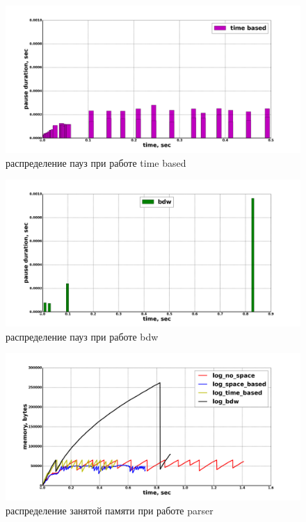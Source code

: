 \documentclass[14pt]{extarticle}
\begin{document}
\begin{figure}[ph]
\caption{\label{pic:time-based-pause}распределение пауз при работе time based}
\includegraphics[width=1\linewidth]{time_based.png}
\end{figure}

\begin{figure}[ph]
\caption{\label{pic:pause-bdw}распределение пауз при работе bdw}
\includegraphics[width=1\linewidth]{bdw.png}
\end{figure}

\begin{figure}[ph]
\caption{\label{pic:allocated}распределение занятой памяти при работе parser}
\includegraphics[width=1\linewidth]{all-allocated.png}
\end{figure}
\end{document}
